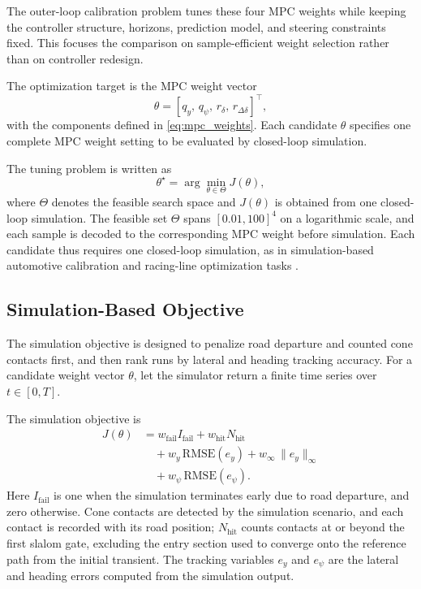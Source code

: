 \documentclass[10pt,twocolumn]{ICCAS}
\begin{document}
The outer-loop calibration problem tunes these four MPC weights while keeping
the controller structure, horizons, prediction model, and steering constraints
fixed. This focuses the comparison on sample-efficient weight selection rather
than on controller redesign.

The optimization target is the MPC weight vector
\begin{equation}
\theta =
\left[
q_y,\,
q_\psi,\,
r_\delta,\,
r_{\Delta\delta}
\right]^\top ,
\label{eq:theta}
\end{equation}
with the components defined in \eqref{eq:mpc_weights}. Each candidate
$\theta$ specifies one complete MPC weight setting to be evaluated by
closed-loop simulation.

The tuning problem is written as
\begin{equation}
\theta^\star =
\arg\min_{\theta \in \Theta} J(\theta),
\label{eq:optimization_problem}
\end{equation}
where $\Theta$ denotes the feasible search space and $J(\theta)$ is obtained
from one closed-loop simulation. The feasible set $\Theta$ spans
$[0.01,100]^4$ on a logarithmic scale, and each sample is decoded to the
corresponding MPC weight before simulation. Each candidate thus requires one
closed-loop simulation, as in simulation-based automotive calibration and
racing-line optimization tasks \cite{jain2020computing,arya2019fully}.

\subsection{Simulation-Based Objective}
\label{subsec:objective}

The simulation objective is designed to penalize road departure and counted cone
contacts first, and then rank runs by lateral and heading tracking accuracy. For
a candidate weight vector $\theta$, let the simulator return a finite time
series over $t \in [0,T]$.

The simulation objective is
\begin{align}
J(\theta)
&=
w_{\mathrm{fail}} I_{\mathrm{fail}}
+ w_{\mathrm{hit}} N_{\mathrm{hit}} \nonumber\\
&\quad
+ w_y\,\mathrm{RMSE}(e_y)
+ w_{\infty}\,\|e_y\|_{\infty} \nonumber\\
&\quad
+ w_\psi\,\mathrm{RMSE}(e_\psi).
\label{eq:objective}
\end{align}
Here $I_{\mathrm{fail}}$ is one when the simulation terminates early due to
road departure, and zero otherwise. Cone contacts are detected by the
simulation scenario, and each contact is recorded with its road position;
$N_{\mathrm{hit}}$ counts contacts at or beyond the first slalom gate,
excluding the entry section used to converge onto the reference path from the
initial transient. The
tracking variables $e_y$ and $e_\psi$ are the lateral and heading errors
computed from the simulation output.
\end{document}
